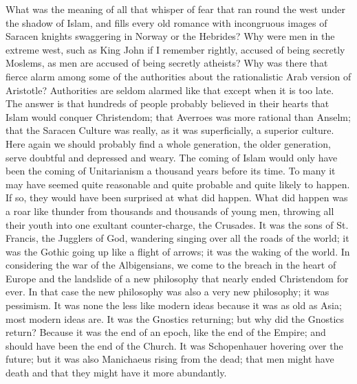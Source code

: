What was the meaning of all that whisper of fear that ran round the west under the shadow of Islam, and fills every old romance with incongruous images of Saracen knights swaggering in Norway or the Hebrides? Why were men in the extreme west, such as King John if I remember rightly, accused of being secretly Moslems, as men are accused of being secretly atheists? Why was there that fierce alarm among some of the authorities about the rationalistic Arab version of Aristotle? Authorities are seldom alarmed like that except when it is too late. The answer is that hundreds of people probably believed in their hearts that Islam would conquer Christendom; that Averroes was more rational than Anselm; that the Saracen Culture was really, as it was superficially, a superior culture. Here again we should probably find a whole generation, the older generation, serve doubtful and depressed and weary. The coming of Islam would only have been the coming of Unitarianism a thousand years before its time. To many it may have seemed quite reasonable and quite probable and quite likely to happen. If so, they would have been surprised at what did happen. What did happen was a roar like thunder from thousands and thousands of young men, throwing all their youth into one exultant counter-charge, the Crusades. It was the sons of St. Francis, the Jugglers of God, wandering singing over all the roads of the world; it was the Gothic going up like a flight of arrows; it was the waking of the world. In considering the war of the Albigensians, we come to the breach in the heart of Europe and the landslide of a new philosophy that nearly ended Christendom for ever. In that case the new philosophy was also a very new philosophy; it was pessimism. It was none the less like modern ideas because it was as old as Asia; most modern ideas are. It was the Gnostics returning; but why did the Gnostics return? Because it was the end of an epoch, like the end of the Empire; and should have been the end of the Church. It was Schopenhauer hovering over the future; but it was also Manichaeus rising from the dead; that men might have death and that they might have it more abundantly.

